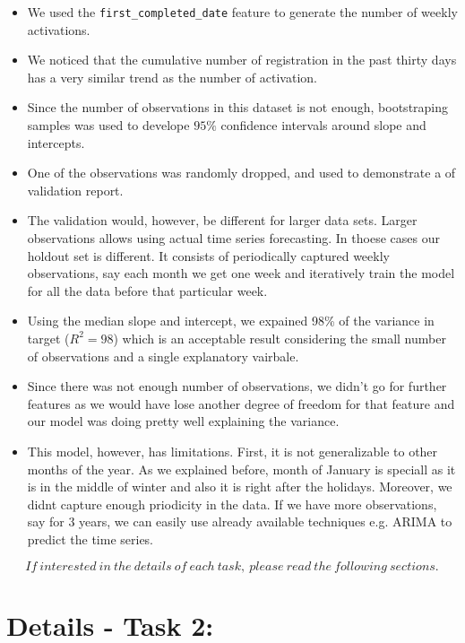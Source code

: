 \documentclass[11pt]{article}
\providecommand{\tightlist}{%
      \setlength{\itemsep}{0pt}\setlength{\parskip}{0pt}}
\begin{document}
\begin{itemize}
\tightlist
\item
  We used the \texttt{first\_completed\_date} feature to generate the
  number of weekly activations.
\item
  We noticed that the cumulative number of registration in the past
  thirty days has a very similar trend as the number of activation.
\item
  Since the number of observations in this dataset is not enough,
  bootstraping samples was used to develope \(95\%\) confidence
  intervals around slope and intercepts.
\item
  One of the observations was randomly dropped, and used to demonstrate
  a of validation report.
\item
  The validation would, however, be different for larger data sets.
  Larger observations allows using actual time series forecasting. In
  thoese cases our holdout set is different. It consists of periodically
  captured weekly observations, say each month we get one week and
  iteratively train the model for all the data before that particular
  week.
\item
  Using the median slope and intercept, we expained 98\% of the variance
  in target (\(R^2=98\)) which is an acceptable result considering the
  small number of observations and a single explanatory vairbale.
\item
  Since there was not enough number of observations, we didn't go for
  further features as we would have lose another degree of freedom for
  that feature and our model was doing pretty well explaining the
  variance.
\item
  This model, however, has limitations. First, it is not generalizable
  to other months of the year. As we explained before, month of January
  is speciall as it is in the middle of winter and also it is right
  after the holidays. Moreover, we didnt capture enough priodicity in
  the data. If we have more observations, say for 3 years, we can easily
  use already available techniques e.g. ARIMA to predict the time
  series.
\end{itemize}

    \textbf{\emph{\[If\ interested\ in\ the\ details\ of\ each\ task,\ please\ read\ the\ following\ sections.\]}}

    \section{Details - Task 2:}\label{details---task-2}
\end{document}
